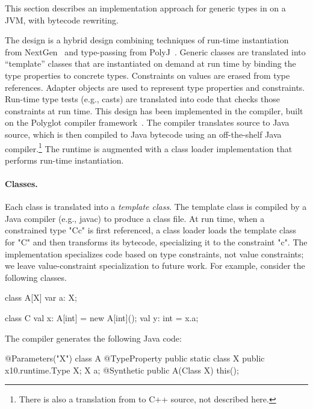 This section describes an implementation approach for generic types in
\Xten{} on a JVM, with bytecode rewriting.

The design is a hybrid design combining techniques of run-time
instantiation from
NextGen~\cite{nextgen,allen03} and type-passing from
PolyJ~\cite{java-popl97}.  Generic classes are translated
into ``template'' classes that are instantiated on demand at run time by
binding the type properties to concrete types.
%
Constraints on values are erased from type references.
Adapter objects are used to represent type
properties and constraints.  
Run-time type tests (e.g., casts) are translated
into code that checks those constraints at run time.
%
This design has been implemented in the \Xten{} compiler, built
on the Polyglot compiler framework~\cite{ncm03}.  The compiler
translates \Xten{} source to Java source, which is then compiled
to Java bytecode using an off-the-shelf Java compiler.\footnote{There is also
a translation from \Xten{} to C++ source, not described here.}
The \Xten{} runtime is augmented with a class loader
implementation that performs run-time instantiation.

\paragraph{Classes.}
Each class is translated into a \emph{template class}.
The template class is compiled by a Java compiler (e.g., javac)
to produce a class file.
At run time, when a constrained type \xcd"C{c}" is first referenced, a
class loader loads the template class for \xcd"C" and then
transforms its bytecode, specializing it to the constraint
\xcd"c".  The implementation specializes code based on type constraints,
not value constraints; we leave value-constraint specialization to
future work.
%
For example, consider the following classes.
{
\begin{xten}
class A[X] {
  var a: X;
}
\end{xten}}
{
\begin{xten}
class C {
  val x: A[int] = new A[int]();
  val y: int = x.a;
}
\end{xten}}

The compiler generates the following Java code:
{
\begin{xten}
@Parameters({"X"})
class A {
  @TypeProperty public static class X { }
  public x10.runtime.Type X;
  X a;
  @Synthetic public A(Class X) { this(); }
}
\end{xten}}
{
}

